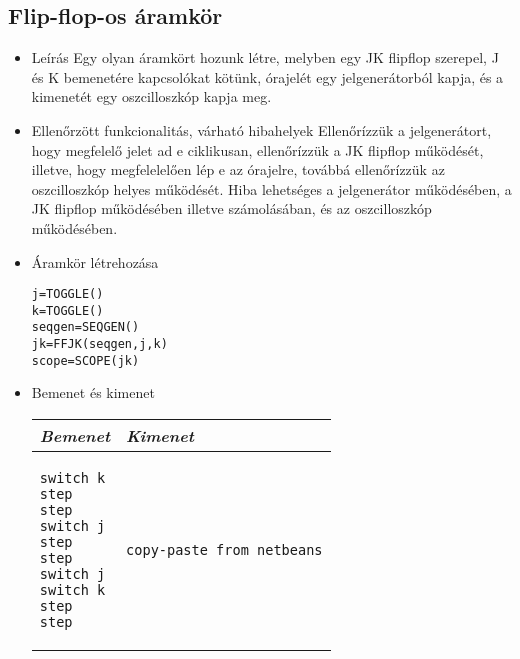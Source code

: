\subsection{Flip-flop-os áramkör}
\begin{itemize}
\item Leírás\newline
Egy olyan áramkört hozunk létre, melyben egy JK flipflop szerepel, J és K bemenetére kapcsolókat kötünk, órajelét egy jelgenerátorból kapja, és a kimenetét egy oszcilloszkóp kapja meg.
\item Ellenőrzött funkcionalitás, várható hibahelyek\newline
Ellenőrízzük a jelgenerátort, hogy megfelelő jelet ad e ciklikusan, ellenőrízzük a JK flipflop működését, illetve, hogy megfelelelően lép e az órajelre, továbbá ellenőrízzük az oszcilloszkóp helyes működését. Hiba lehetséges a jelgenerátor működésében, a JK flipflop működésében illetve számolásában, és az oszcilloszkóp működésében.

\item Áramkör létrehozása

\begin{verbatim}
j=TOGGLE()
k=TOGGLE()
seqgen=SEQGEN()
jk=FFJK(seqgen,j,k)
scope=SCOPE(jk)
\end{verbatim}

\item Bemenet és kimenet\newline

\begin{tabular}{|p{5cm}|p{5cm}|} 
\hline 
\textit{Bemenet} & \textit{Kimenet} \\ \hline
\begin{verbatim}
switch k
step
step
switch j
step
step
switch j
switch k
step
step
\end{verbatim}
& 
\begin{verbatim}
copy-paste from netbeans
\end{verbatim}
\\ \hline
\end{tabular}

\end{itemize}


